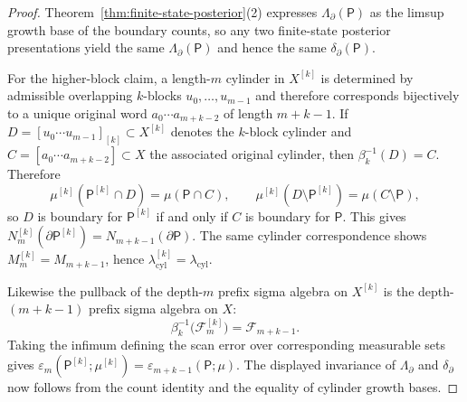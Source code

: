 \documentclass{etds}%
\numberwithin{equation}{section}
\theoremstyle{plain}
\theoremstyle{definition}
\theoremstyle{remark}
\begin{document}
\begin{proof}
Theorem~\ref{thm:finite-state-posterior}(2) expresses
$\Lambda_\partial(\mathsf{P})$ as the limsup growth base of the boundary
counts, so any two finite-state posterior presentations yield the same
$\Lambda_\partial(\mathsf{P})$ and hence the same
$\delta_\partial(\mathsf{P})$.

For the higher-block claim, a length-$m$ cylinder in $X^{[k]}$ is determined by
admissible overlapping $k$-blocks
$u_0,\dots,u_{m-1}$ and therefore corresponds bijectively to a unique original
word $a_0\cdots a_{m+k-2}$ of length $m+k-1$.  If
$D=[u_0\cdots u_{m-1}]_{[k]}\subset X^{[k]}$ denotes the $k$-block cylinder and
$C=[a_0\cdots a_{m+k-2}]\subset X$ the associated original cylinder, then
$\beta_k^{-1}(D)=C$.  Therefore
\[
\mu^{[k]}(\mathsf{P}^{[k]}\cap D)=\mu(\mathsf{P}\cap C),
\qquad
\mu^{[k]}(D\setminus \mathsf{P}^{[k]})=\mu(C\setminus\mathsf{P}),
\]
so $D$ is boundary for $\mathsf{P}^{[k]}$ if and only if $C$ is boundary for
$\mathsf{P}$.  This gives
$N_m^{[k]}(\partial\mathsf{P}^{[k]})=N_{m+k-1}(\partial\mathsf{P})$.  The same
cylinder correspondence shows
$M_m^{[k]}=M_{m+k-1}$, hence
$\lambda_{\mathrm{cyl}}^{[k]}=\lambda_{\mathrm{cyl}}$.

Likewise the pullback of the depth-$m$ prefix sigma algebra on $X^{[k]}$ is the
depth-$(m+k-1)$ prefix sigma algebra on $X$:
\[
\beta_k^{-1}\bigl(\mathcal{F}_m^{[k]}\bigr)=\mathcal{F}_{m+k-1}.
\]
Taking the infimum defining the scan error over corresponding measurable sets
gives
$\varepsilon_m(\mathsf{P}^{[k]};\mu^{[k]})
=\varepsilon_{m+k-1}(\mathsf{P};\mu)$.  The displayed invariance of
$\Lambda_\partial$ and $\delta_\partial$ now follows from the count identity
and the equality of cylinder growth bases.
\end{proof}
\end{document}
